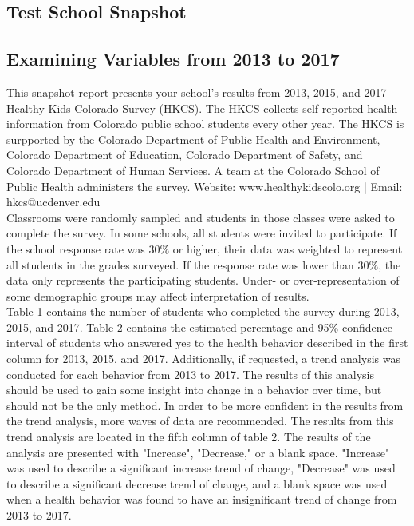 \documentclass[11pt]{article}
\begin{document}



\begin{center}
  \section*{Test School Snapshot}
  \subsection*{Examining Variables from 2013 to 2017}
\end{center}
\vspace{-0.5cm}
\noindent\makebox[\linewidth]{\rule{\paperwidth}{1pt}}

\vspace{0.15in}
\noindent This snapshot report presents your school's results from 2013, 2015, and 2017 Healthy Kids Colorado Survey (HKCS). The HKCS collects self-reported health information from Colorado public school students every other year. The HKCS is surpported by the Colorado Department of Public Health and Environment, Colorado Department of Education, Colorado Department of Safety, and Colorado Department of Human Services. A team at the Colorado School of Public Health administers the survey. Website: www.healthykidscolo.org | Email: hkcs@ucdenver.edu \\

\noindent Classrooms were randomly sampled and students in those classes were asked to complete the survey. In some schools, all students were invited to participate. If the school response rate was 30\% or higher, their data was weighted to represent all students in the grades surveyed. If the response rate was lower than 30\%, the data only represents the participating students. Under- or over-representation of some demographic groups may affect interpretation of results.\\

\noindent Table 1 contains the number of students who completed the survey during 2013, 2015, and 2017. Table 2 contains the estimated percentage  and 95\% confidence interval of students who answered yes to the health behavior described in the first column for 2013, 2015, and 2017. Additionally, if requested, a trend analysis was conducted for each behavior from 2013 to 2017. The results of this analysis should be used to gain some insight into change in a behavior over time, but should not be the only method. In order to be more confident in the results from the trend analysis, more waves of data are recommended. The results from this trend analysis are located in the fifth column of table 2. The results of the analysis are presented with "Increase", "Decrease," or a blank space. "Increase" was used to describe a significant increase trend of change, "Decrease" was used to describe a significant decrease trend of change, and a blank space was used when a health behavior was found to have an insignificant trend of change from 2013 to 2017.
\end{document}
